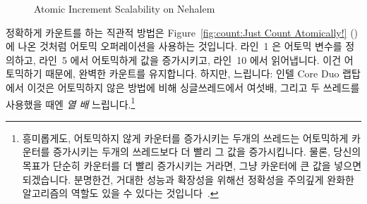 \begin{figure}[tb]
\centering
{}
\caption{Atomic Increment Scalability on Nehalem}
\label{fig:count:Atomic Increment Scalability on Nehalem}
\end{figure}

정확하게 카운트를 하는 직관적 방법은
Figure~\ref{fig:count:Just Count Atomically!} ()
에 나온 것처럼 어토믹 오퍼레이션을 사용하는 것입니다.
라인~1 은 어토믹 변수를 정의하고, 라인~5 에서 어토믹하게 값을 증가시키고,
라인~10 에서 읽어냅니다.
이건 어토믹하기 때문에, 완벽한 카운트를 유지합니다.
하지만, 느립니다: 인텔 Core Duo 랩탑에서 이것은 어토믹하지 않은 방법에 비해
싱글쓰레드에서 여섯배, 그리고 두 쓰레드를 사용했을 때엔 \emph{열 배}
느립니다.\footnote{
	흥미롭게도, 어토믹하지 않게 카운터를 증가시키는 두개의 쓰레드는
	어토믹하게 카운터를 증가시키는 두개의 쓰레드보다 더 빨리 그 값을
	증가시킵니다.
	물론, 당신의 목표가 단순히 카운터를 더 빨리 증가시키는 거라면, 그냥
	카운터에 큰 값을 넣으면 되겠습니다.
	분명한건, 거대한 성능과 확장성을 위해선 정확성을 주의깊게 완화한
	알고리즘의 역할도 있을 수 있다는
	것입니다~\cite{Andrews91textbook,Arcangeli03,DavidUngar2011unsync}.}
\iffalse

